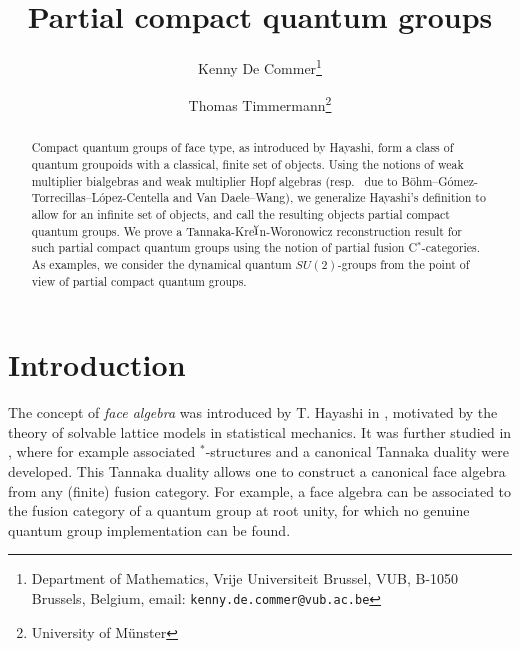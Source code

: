 \documentclass[10pt]{article}
\date{}
\theoremstyle{definition}
\numberwithin{equation}{section}
\begin{document}
\title{Partial compact quantum groups}

\author{Kenny De Commer\thanks{Department of Mathematics, Vrije Universiteit Brussel, VUB, B-1050 Brussels, Belgium, email: {\tt kenny.de.commer@vub.ac.be}}
\and Thomas Timmermann\thanks{University of M\"{u}nster}}

\maketitle

\begin{abstract}
\noindent Compact quantum groups of face type, as introduced by
Hayashi, form a class of quantum groupoids with a classical, finite
set of objects. Using the notions of  weak multiplier bialgebras and
weak multiplier Hopf algebras (resp.~ due to
B{\"o}hm--G\'{o}mez-Torrecillas--L\'{o}pez-Centella and Van
Daele--Wang), we generalize Hayashi's definition to allow for an
infinite set of objects, and call the resulting objects partial
compact quantum groups. We prove a
Tannaka-Kre$\breve{\textrm{\i}}$n-Woronowicz reconstruction result for
such partial compact quantum groups using the notion of  partial fusion C$^*$-categories. As examples, we consider the dynamical quantum $SU(2)$-groups from the point of view of partial compact quantum groups.
\end{abstract}









\section*{Introduction}

The concept of \emph{face algebra} was introduced by T. Hayashi in \cite{Hay2}, motivated by the theory of solvable lattice models in statistical mechanics. It was further studied in \cite{Hay1,Hay3,Hay8,Hay6, Hay4, Hay5,Hay7}, where for example associated $^*$-structures and a canonical Tannaka duality were developed. This Tannaka duality allows one to construct a canonical face algebra from any (finite) fusion category. For example, a face algebra can be associated to the fusion category of a quantum group at root unity, for which no genuine quantum group implementation can be found. 
\end{document}
